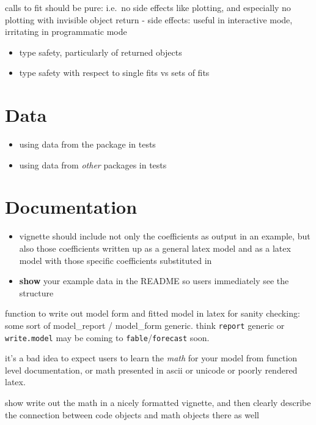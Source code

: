 \documentclass[]{book}
\providecommand{\tightlist}{%
  \setlength{\itemsep}{0pt}\setlength{\parskip}{0pt}}
\theoremstyle{definition}
\theoremstyle{definition}
\theoremstyle{definition}
\theoremstyle{remark}
\begin{document}
calls to fit should be pure: i.e.~no side effects like plotting, and
especially no plotting with invisible object return - side effects:
useful in interactive mode, irritating in programmatic mode

\begin{itemize}
\tightlist
\item
  type safety, particularly of returned objects
\item
  type safety with respect to single fits vs sets of fits
\end{itemize}

\chapter{Data}\label{data}

\begin{itemize}
\tightlist
\item
  using data from the package in tests
\item
  using data from \emph{other} packages in tests
\end{itemize}

\chapter{Documentation}\label{documentation}

\begin{itemize}
\item
  vignette should include not only the coefficients as output in an
  example, but also those coefficients written up as a general latex
  model and as a latex model with those specific coefficients
  substituted in
\item
  \textbf{show} your example data in the README so users immediately see
  the structure
\end{itemize}

function to write out model form and fitted model in latex for sanity
checking: some sort of model\_report / model\_form generic. think
\texttt{report} generic or \texttt{write.model} may be coming to
\texttt{fable}/\texttt{forecast} soon.

it's a bad idea to expect users to learn the \emph{math} for your model
from function level documentation, or math presented in ascii or unicode
or poorly rendered latex.

show write out the math in a nicely formatted vignette, and then clearly
describe the connection between code objects and math objects there as
well
\end{document}
